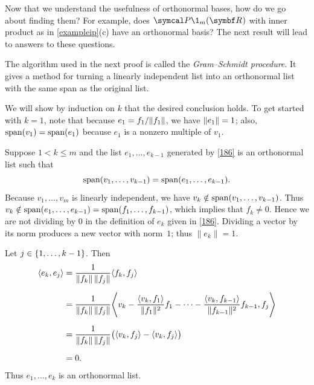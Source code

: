 Now that we understand the usefulness of orthonormal bases, how do we
go about finding them?  For example, does $\P\1_m(\R{})$ with inner
product as in \ref{exampleip}(c) have an
orthonormal basis? The next result will lead to
answers to these questions.


The algorithm used in the next proof is
called the \emph{Gram--Schmidt procedure}.
It gives a method for turning a linearly independent list into an orthonormal
list with the same span as the original list.


\proof
We will show by induction on $k$ that the desired conclusion holds. To get started with $k = 1$, note that because $e_1 = f_1/\lVert f_1\rVert$, we have
$\lVert e_1\rVert = 1$; also, $\operatorname{span}(v_1) = \operatorname{span}(e_1)$ because $e_1$ is a nonzero multiple of $v_1$.

Suppose $1 < k \le m$ and the list $e_1, \dots, e_{k-1}$ generated by \ref{186} is an orthonormal list such that
\begin{equation} \label{83}
\operatorname{span} (v_1, \dots, v_{k-1}) = \operatorname{span} (e_1, \dots, e_{k-1}).
\end{equation}%
Because $v_1, \dots, v_m$ is linearly independent, we have $v_k \notin \operatorname{span} (v_1, \dots, v_{k-1})$. Thus
$v_k \notin \operatorname{span} (e_1, \dots, e_{k-1}) = \operatorname{span} (f_1, \dots, f_{k-1})$, which implies that $f_k \ne 0$.
Hence  we are not dividing by $0$ in the definition of $e_k$ given in \ref{186}.  Dividing a vector by its norm produces a new vector with norm~$1$; thus $\|e_k\| = 1$.

Let $j \in \{1, \ldots, k-1\}$.  Then
\begin{align*}
\ip{e_k, e_j} &= \frac{1}{\norm{f_k} \, \norm{f_j}} \ip{f_k, f_j}\\[6bp]
&= \frac{1}{\norm{f_k}  \, \norm{f_j}} \ip[\Bigg]{  v_k - \frac{\ip{v_k, f_1}}{\norm{f_1}^2} f_1 - \dots - \frac{\ip{v_k, f_{k-1} }}{\norm{f_{k-1}}^2} f_{k-1}, f_j } \\[6bp]
&= \frac{1}{\norm{f_k}  \, \norm{f_j}} \paren[\big]{\ip{v_k, f_j} - \ip{v_k, f_j}} \\[6bp]
&= 0.
\end{align*}
Thus $e_1, \dots, e_k$ is an orthonormal list.


